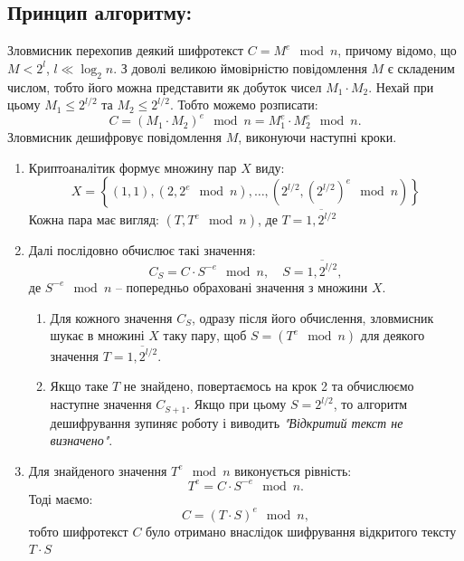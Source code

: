 \subsection{Принцип алгоритму:}
Зловмисник перехопив деякий шифротекст $C = M^{e} \mod n$, причому відомо, що $M < 2^{l}$, $l \ll \log_{2} n$. 
З доволі великою ймовірністю повідомлення $M$ є складеним числом, тобто його можна представити як добуток чисел 
$M_{1} \cdot M_{2}$. Нехай при цьому $M_{1} \leq 2^{l/2}$ та $M_{2} \leq 2^{l/2}$. Тобто можемо розписати: 
\begin{equation*}
    C = \left(M_{1} \cdot M_{2}\right)^{e} \mod n = M_{1}^{e} \cdot M_{2}^{e} \mod n.
\end{equation*} 
Зловмисник дешифровує повідомлення $M$, виконуючи наступні кроки.
\begin{enumerate}
    \item Криптоаналітик формує множину пар $X$ виду:
        \begin{equation*}
            X = \left\{\left(1, 1\right), \left(2, 2^{e} \mod n\right), \dots, \left(2^{l/2}, \left(2^{l/2}\right)^{e} \mod n\right)\right\}
        \end{equation*}
        Кожна пара має вигляд: $\left(T, T^{e} \mod n\right)$, де $T = \overline{1, 2^{l/2}}$
    \item Далі послідовно обчислює такі значення:
        \begin{equation*}
            C_{S} = C \cdot S^{-e} \mod n, \quad S = \overline{1, 2^{l/2}},
        \end{equation*}
        де $S^{-e} \mod n$ -- попередньо обраховані значення з множини $X$.
        \begin{enumerate}
            \item Для кожного значення $C_{S}$, одразу після його обчислення, зловмисник шукає в множині $X$ 
                таку пару, щоб $S = (T^{e} \mod n)$ для деякого значення $T = \overline{1, 2^{l/2}}$.
            \item Якщо таке $T$ не знайдено, повертаємось на крок 2 та обчислюємо наступне значення $C_{S+1}$. 
                Якщо при цьому $S = 2^{l/2}$, то алгоритм дешифрування зупиняє роботу і виводить \textit{"Відкритий текст 
                не визначено"{}}.
        \end{enumerate}
    \item Для знайденого значення $T^{e} \mod n$ виконується рівність:
        \begin{equation*}
            T^{e} = C \cdot S^{-e} \mod n.
        \end{equation*}
        Тоді маємо:
        \begin{equation*}
            C = \left(T \cdot S\right)^{e} \mod n,
        \end{equation*}    
        тобто шифротекст $C$ було отримано внаслідок шифрування відкритого тексту $T \cdot S$
\end{enumerate}
